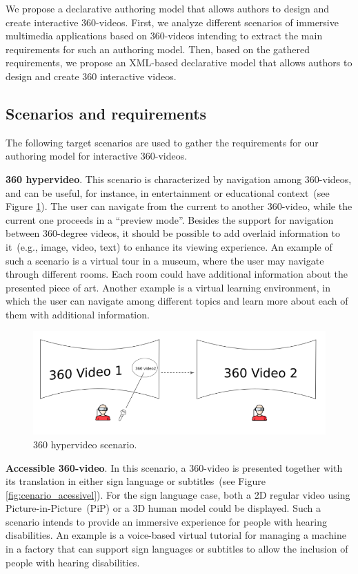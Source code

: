 We propose a declarative authoring model that allows authors to design and create interactive 360-videos.
First, we analyze different scenarios of immersive multimedia applications based on 360-videos intending to extract the main requirements for such an authoring model.
Then, based on the gathered requirements, we propose an XML-based declarative model that allows authors to design and create 360 interactive videos.

\subsection{Scenarios and requirements}
\label{subsec:authoring_scenarios}

The following target scenarios are used to gather the requirements for our authoring model for interactive 360-videos.

\textbf{360 hypervideo}.
This scenario is characterized by navigation among 360-videos, and can be useful, for instance, in entertainment or educational context~(see Figure \ref{fig:cenario_hiper}). The user can navigate from the current to another 360-video, while the current one proceeds in a ``preview mode''. Besides the support for navigation between 360-degree videos, it should be possible to add overlaid information to it~(e.g., image, video, text) to enhance its viewing experience. An example of such a scenario is a virtual tour in a museum, where the user may navigate through different rooms. Each room could have additional information about the presented piece of art. Another example is a virtual learning environment, in which the user can navigate among different topics and learn more about each of them with additional information.

\begin{figure}[!ht]
    \centering
    \includegraphics[width=0.65\linewidth]{img/video360/hyper.png}
    \caption{360 hypervideo scenario.}
    \label{fig:cenario_hiper}
\end{figure}

\textbf{Accessible 360-video}. 
In this scenario, a 360-video is presented together with its translation in either sign language or subtitles~(see Figure \ref{fig:cenario_acessivel}). For the sign language case, both a 2D regular video using Picture-in-Picture~(PiP) or a 3D human model could be displayed. Such a scenario intends to provide an immersive experience for people with hearing disabilities. An example is a voice-based virtual tutorial for managing a machine in a factory that can support sign languages or subtitles to allow the inclusion of people with hearing disabilities.

